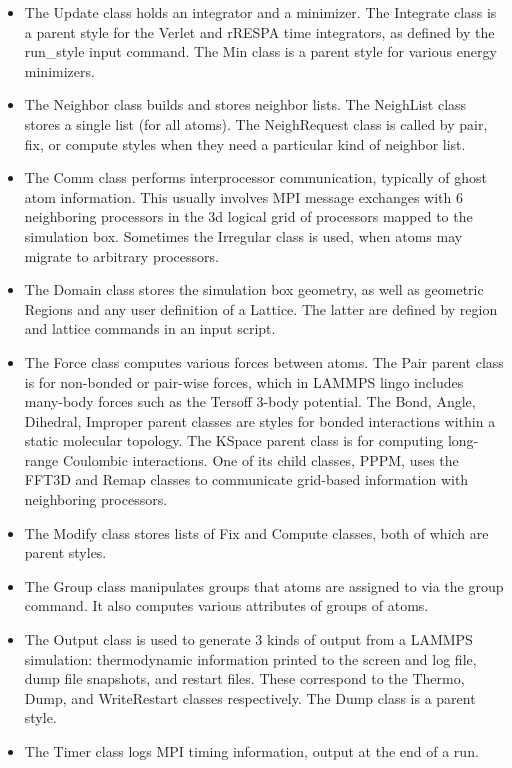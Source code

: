 \documentclass{article}
\begin{document}
\begin{itemize}
\item The Update class holds an integrator and a minimizer.  The
  Integrate class is a parent style for the Verlet and rRESPA time
  integrators, as defined by the run\_style input command.  The Min
  class is a parent style for various energy minimizers.

\item The Neighbor class builds and stores neighbor lists.  The
  NeighList class stores a single list (for all atoms).  The
  NeighRequest class is called by pair, fix, or compute styles when
  they need a particular kind of neighbor list.

\item The Comm class performs interprocessor communication, typically
  of ghost atom information.  This usually involves MPI message
  exchanges with 6 neighboring processors in the 3d logical grid of
  processors mapped to the simulation box.  Sometimes the Irregular
  class is used, when atoms may migrate to arbitrary processors.

\item The Domain class stores the simulation box geometry, as well as
  geometric Regions and any user definition of a Lattice.  The latter
  are defined by region and lattice commands in an input script.

\item The Force class computes various forces between atoms.  The Pair
  parent class is for non-bonded or pair-wise forces, which in LAMMPS
  lingo includes many-body forces such as the Tersoff 3-body
  potential.  The Bond, Angle, Dihedral, Improper parent classes are
  styles for bonded interactions within a static molecular topology.
  The KSpace parent class is for computing long-range Coulombic
  interactions.  One of its child classes, PPPM, uses the FFT3D and
  Remap classes to communicate grid-based information with neighboring
  processors.

\item The Modify class stores lists of Fix and Compute classes, both
  of which are parent styles.

\item The Group class manipulates groups that atoms are assigned to
  via the group command.  It also computes various attributes of
  groups of atoms.

\item The Output class is used to generate 3 kinds of output from a
  LAMMPS simulation: thermodynamic information printed to the screen
  and log file, dump file snapshots, and restart files.  These
  correspond to the Thermo, Dump, and WriteRestart classes
  respectively.  The Dump class is a parent style.

\item The Timer class logs MPI timing information, output at the end
  of a run.

\end{itemize}
\end{document}
